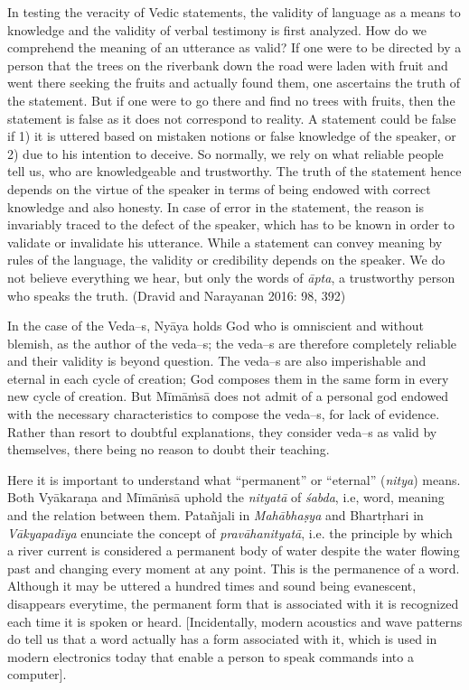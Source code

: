 In testing the veracity of Vedic statements, the validity of language as a means to knowledge and the validity of verbal testimony is first analyzed. How do we comprehend the meaning of an utterance as valid? If one were to be directed by a person that the trees on the riverbank down the road were laden with fruit and went there seeking the fruits and actually found them, one ascertains the truth of the statement. But if one were to go there and find no trees with fruits, then the statement is false as it does not correspond to reality. A statement could be false if 1) it is uttered based on mistaken notions or false knowledge of the speaker, or 2) due to his intention to deceive. So normally, we rely on what reliable people tell us, who are knowledgeable and trustworthy. The truth of the statement hence depends on the virtue of the speaker in terms of being endowed with correct knowledge and also honesty. In case of error in the statement, the reason is invariably traced to the defect of the speaker, which has to be known in order to validate or invalidate his utterance. While a statement can convey meaning by rules of the language, the validity or credibility depends on the speaker. We do not believe everything we hear, but only the words of \textit{āpta}, a trustworthy person who speaks the truth. (Dravid and Narayanan 2016: 98, 392)

In the case of the Veda--s, Nyāya holds God who is omniscient and without blemish, as the author of the veda--s; the veda--s are therefore completely reliable and their validity is beyond question. The veda--s are also imperishable and eternal in each cycle of creation; God composes them in the same form in every new cycle of creation. But Mīmāṁsā does not admit of a personal god endowed with the necessary characteristics to compose the veda--s, for lack of evidence. Rather than resort to doubtful explanations, they consider veda--s as valid by themselves, there being no reason to doubt their teaching.

Here it is important to understand what “permanent” or “eternal” (\textit{nitya}) means. Both {Vyākaraṇa} and Mīmāṁsā uphold the \textit{nityatā} of \textit{śabda}, i.e, word, meaning and the relation between them. Patañjali in \textit{Mahābhaṣya} and Bhartṛhari in \textit{Vākyapadīya} enunciate the concept of \textit{pravāhanityatā}, i.e. the principle by which a river current is considered a permanent body of water despite the water flowing past and changing every moment at any point. This is the permanence of a word. Although it may be uttered a hundred times and sound being evanescent, disappears everytime, the permanent form that is associated with it is recognized each time it is spoken or heard. [Incidentally, modern acoustics and wave patterns do tell us that a word actually has a form associated with it, which is used in modern electronics today that enable a person to speak commands into a computer].

